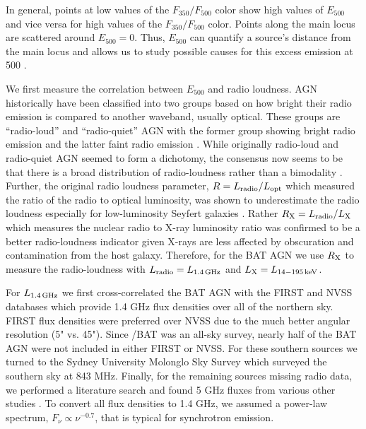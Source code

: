 In general, points at low values of the $F_{350}/F_{500}$ color show high values of $E_{500}$ and vice versa for high values of the $F_{350}/F_{500}$ color. Points along the main locus are scattered around $E_{500} = 0$. Thus, $E_{500}$ can quantify a source's distance from the main locus and allows us to study possible causes for this excess emission at 500 \um.

We first measure the correlation between $E_{500}$ and radio loudness. AGN historically have been classified into two groups based on how bright their radio emission is compared to another waveband, usually optical. These groups are ``radio-loud'' and ``radio-quiet'' AGN with the former group showing bright radio emission and the latter faint radio emission \citep{Kellermann:1989sf,Xu:1999ty}. While originally radio-loud and radio-quiet AGN seemed to form a dichotomy, the consensus now seems to be that there is a broad distribution of radio-loudness rather than a bimodality \citep{Laor:2003yg,White:2000rz,Cirasuolo:2003rm,Cirasuolo:2003zl,Laor:2003yg}. Further, the original radio loudness parameter, $R = L_{\rm radio}/L_{\rm opt}$ which measured the ratio of the radio to optical luminosity, was shown to underestimate the radio loudness especially for low-luminosity Seyfert galaxies \citep{Terashima:2003fv}. Rather $R_{\rm X} = L_{\rm radio}/L_{\rm X}$ which measures the nuclear radio to X-ray luminosity ratio was confirmed to be a better radio-loudness indicator given X-rays are less affected by obscuration and contamination from the host galaxy. Therefore, for the BAT AGN we use $R_{\rm X}$ to measure the radio-loudness with $L_{\rm radio} = L_{\rm 1.4\,GHz}$ and $L_{\rm X} = L_{\rm 14-195\,keV}$. 

For $L_{\rm 1.4\,GHz}$ we first cross-correlated the BAT AGN with the FIRST and NVSS databases which provide 1.4 GHz flux densities over all of the northern sky. FIRST flux densities were preferred over NVSS due to the much better angular resolution (5" vs. 45"). Since \swift/BAT was an all-sky survey, nearly half of the BAT AGN were not included in either FIRST or NVSS. For these southern sources we turned to the Sydney University Molonglo Sky Survey \citep[SUMSS;][]{Bock:1999fp} which surveyed the southern sky at 843 MHz. Finally, for the remaining sources missing radio data, we performed a literature search and found 5 GHz fluxes from various other studies \citep{Becker:1991qd,Griffith:1993qr,Rush:1996db,Ho:2001hl,Shi:2005rc}. To convert all flux densities to 1.4 GHz, we assumed a power-law spectrum, $F_{\nu} \propto \nu^{-0.7}$, that is typical for synchrotron emission. 
  
  
  